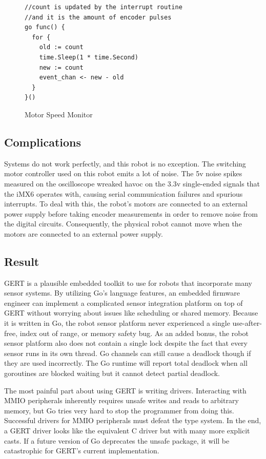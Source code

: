 \begin{figure}[h]
\begin{center}
\begin{lstlisting}
//count is updated by the interrupt routine
//and it is the amount of encoder pulses
go func() {
  for {
    old := count
    time.Sleep(1 * time.Second)
    new := count
    event_chan <- new - old
  }
}()
\end{lstlisting}
\end{center}
  \caption{Motor Speed Monitor} \label{fig:speedmon}
\end{figure}

\subsection{Complications}
Systems do not work perfectly, and this robot is no exception. The switching motor controller used
on this robot emits a lot of noise. The 5v noise spikes measured on the oscilloscope wreaked havoc
on the 3.3v single-ended signals that the iMX6 operates with, causing serial communication failures
and spurious interrupts. To deal with this, the robot's motors are connected to an external power supply before
taking encoder measurements in order to remove noise from the digital circuits. Consequently, the physical
robot cannot move when the motors are connected to an external power supply.

\subsection{Result}
GERT is a plausible embedded toolkit to use for robots that incorporate many sensor systems.
By utilizing Go's language features, an embedded firmware engineer can implement a complicated sensor integration
platform on top of GERT without worrying about issues like scheduling or shared memory. Because it is written in Go,
the robot sensor platform
never experienced a single use-after-free, index out of range, or memory safety bug.
As an added bonus, the robot sensor platform also does not contain a single lock despite the fact that every sensor
runs in its own thread. Go channels can still cause a deadlock though if they are used incorrectly. The Go runtime
will report total deadlock when all goroutines are blocked waiting but it cannot detect partial deadlock.

The most painful part about using GERT is writing drivers. Interacting with MMIO
peripherals inherently requires unsafe writes and reads to arbitrary memory, but Go
tries very hard to stop the programmer from doing this. Successful drivers for MMIO
peripherals must defeat the type system. In the end, a GERT driver
looks like the equivalent C driver but with many more explicit casts.
If a future version of Go deprecates the unsafe package, it will be catastrophic for
GERT's current implementation.




